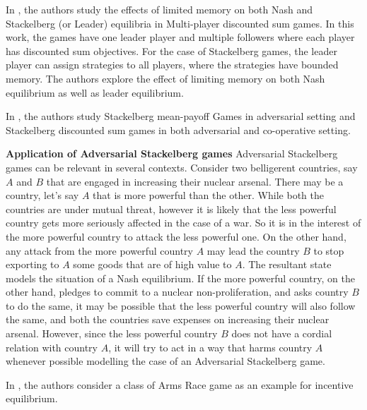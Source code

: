 In \cite{GS15}, the authors study the effects of limited memory on both Nash and Stackelberg (or Leader) equilibria in Multi-player discounted sum games. 
In this work, the games have one leader player and multiple followers where each player has discounted sum objectives. 
For the case of Stackelberg games, the leader player can assign strategies to all players, where the strategies have bounded memory. The authors explore the effect of limiting memory on both Nash equilibrium as well as leader equilibrium.

In \cite{FGR20}, the authors study Stackelberg mean-payoff Games in adversarial setting and  Stackelberg discounted sum games in both adversarial and co-operative setting.

\textbf{Application of Adversarial Stackelberg games} Adversarial Stackelberg games can be relevant in several contexts. Consider two belligerent countries, say $A$ and $B$ that are engaged in increasing their nuclear arsenal. There may be a country, let's say $A$ that is more powerful than the other. While both the countries are under mutual threat, however it is likely that the less powerful country gets more seriously affected in the case of a war. So it is in the interest of the more powerful country to attack the less powerful one. On the other hand, any attack from the more powerful country $A$ may lead the country $B$ to stop exporting to $A$ some goods that are of high value to $A$. The resultant state models the situation of a Nash equilibrium. If the more powerful country, on the other hand, pledges to commit to a nuclear non-proliferation, and asks country $B$ to do the same, it may be possible that the less powerful country will also follow the same, and both the countries save expenses on increasing their nuclear arsenal. However, since the less powerful country $B$ does not have a cordial relation with country $A$, it will try to act in a way that harms  country $A$ whenever possible modelling the case of an Adversarial Stackelberg game.

In \cite{GS18}, the authors consider a class of Arms Race game as an example for incentive equilibrium.


